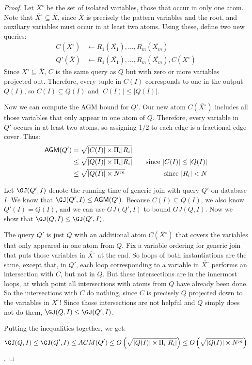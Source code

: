 \begin{proof}
  Let $\overline{X^\circ}$ be the set of isolated variables,
   those that occur in only one atom.
  Note that $\overline{X^\circ} \subseteq \overline{X}$,
   since $\overline{X}$ is precisely the pattern variables and the root,
   and auxiliary variables must occur in at least two atoms.
  Using these,
   define two new queries:
  \begin{align*}
  C(\overline{X^\circ}) & \gets R_{1}(\overline{X_{1}}), \ldots, R_m(\overline{X_m}) \\
  Q'(\overline{X}) & \gets R_{1}(\overline{X_{1}}), \ldots, R_m(\overline{X_m}), C(\overline{X^\circ})
  \end{align*}
 Since $\overline{X^\circ} \subseteq \overline{X}$,
  $C$ is the same query as $Q$ but with zero or more variables projected out.
 Therefore,
  every tuple in $C(I)$ corresponds to one in the output $Q(I)$,
  so $C(I) \subseteq Q(I)$ and $|C(I)| \leq |Q(I)|$.

 Now we can compute the AGM bound for $Q'$.
 Our new atom $C(\overline{X^\circ})$
  includes all those variables that only appear in one atom of $Q$.
 Therefore, every variable in $Q'$ occurs in at least two atoms,
  so assigning $1/2$ to each edge is a fractional edge cover.
 Thus:
 \begin{align*}
   \textsf{AGM}(Q') &= \sqrt{|C(I)| \times \Pi_i |R_i|} \\
                    &\leq \sqrt{|Q(I)| \times \Pi_i |R_i|} &\text{\quad since $|C(I)| \leq |Q(I)|$} \\
                    &\leq \sqrt{|Q(I)| \times N^m} &\text{\quad since $|R_i| < N$}
 \end{align*}

 Let $\GJ(Q', I)$ denote the running time
  of generic join with query $Q'$ on database $I$.
 We know that $\GJ(Q', I) \leq \textsf{AGM}(Q')$.
 Because $C(I) \subseteq Q(I)$, we also know $Q'(I) = Q(I)$,
  and we can use $GJ(Q', I)$ to bound $GJ(Q, I)$.
 Now we show that $\GJ(Q, I) \leq \GJ(Q', I)$.

 The query $Q'$ is just $Q$ with an additional
  atom $C(\overline{X^\circ})$ that
  covers the variables that only appeared in one atom from $Q$.
 Fix a variable ordering for generic join that puts those variables
  in $\overline{X^\circ}$ at the end.
 So loops of both \GJ instantiations are the same,
  except that, in $Q'$,
  each loop corresponding to a variable in $\overline{X^\circ}$ performs an intersection with $C$,
  but not in $Q$.
 But these intersections are in the innermost loops,
  at which point all intersections with atoms from $Q$ have already been done.
 So the intersections with $C$ do nothing,
  since $C$ is precisely $Q$ projected down to the variables in $\overline{X^\circ}$!
 Since those intersections are not helpful and $Q$ simply does not do them,
  $\GJ(Q, I) \leq \GJ(Q', I)$.

 Putting the inequalities together,
  we get:
 \[
   \GJ(Q, I)
   \leq
   \GJ(Q', I)
   \leq
   AGM(Q')
   \leq
   O\left(\sqrt{|Q(I)| \times \Pi_{i}|R_i|}\right)
   \leq
    O\left(\sqrt{|Q(I)| \times N^m}\right)
 \].
\end{proof}

